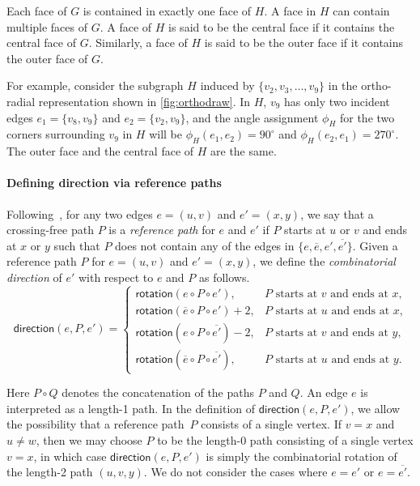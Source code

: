 \documentclass{theoretics}
\newcommand{\rotation}{\mathsf{rotation}}
\newcommand{\direction}{\mathsf{direction}}
\begin{document}
Each face of $G$ is contained in exactly one face of $H$. A face in $H$ can contain multiple faces of $G$. A face of $H$ is said to be the central face if it contains the central face of $G$. Similarly, a face of $H$ is said to be the outer face if it contains the outer face of $G$. 

For example, consider the subgraph $H$ induced by $\{v_2, v_3, \ldots, v_9\}$ in the ortho-radial representation shown in \cref{fig:orthodraw}. In $H$, $v_9$ has only two incident edges $e_1 = \{v_8, v_9\}$ and $e_2 = \{v_2, v_9\}$, and the angle assignment $\phi_H$ for the two corners surrounding $v_9$ in $H$ will be   $\phi_H(e_1, e_2) = 90^\circ$ and $\phi_H(e_2, e_1) = 270^\circ$. The outer face and the central face of $H$ are the same.


\paragraph{Defining direction via reference paths}
 Following~\cite{barth2023topology}, for any two edges $e=(u,v)$ and $e'=(x,y)$, we say that a crossing-free path $P$ is a \emph{reference path} for $e$ and $e'$ if $P$ starts at $u$ or $v$ and ends at $x$ or $y$ such that $P$ does not contain any of the edges in $\{e, \overline{e}, e', \overline{e'}\}$. Given  a reference path $P$ for  $e=(u,v)$ and $e'=(x,y)$, we define the \emph{combinatorial direction} of $e'$ with respect to $e$ and $P$ as follows.   
\[
\direction(e, P, e')=\begin{cases}
\rotation(e \circ P \circ e'), & \text{$P$ starts at $v$ and ends at $x$,}\\
\rotation(\overline{e} \circ P \circ e')+2, & \text{$P$ starts at $u$ and ends at $x$,}\\
\rotation(e \circ P \circ \overline{e'})-2, & \text{$P$ starts at $v$ and ends at $y$,}\\
\rotation(\overline{e} \circ P \circ \overline{e'}), & \text{$P$ starts at $u$ and ends at $y$.}
		 \end{cases}
\]

Here $P \circ Q$ denotes the concatenation of the paths $P$ and $Q$. An edge $e$ is interpreted as a length-1 path. In the definition of $\direction(e, P, e')$, we allow the possibility that a reference path~$P$ consists of a single vertex. If $v=x$ and $u \neq w$, then we may choose $P$ to be the length-0 path consisting of a single vertex $v=x$, in which case $\direction(e, P, e')$ is simply the combinatorial rotation of the length-2 path $(u,v,y)$.
We do not consider the cases where $e = e'$ or $e = \overline{e'}$. 
\end{document}
